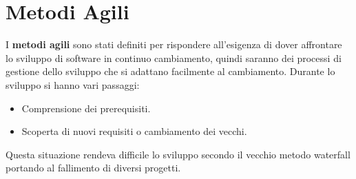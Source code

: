 \chapter{Metodi Agili}
I \textbf{metodi agili} sono stati definiti per rispondere all'esigenza di dover
affrontare lo sviluppo di software in continuo cambiamento, quindi saranno dei
processi di gestione dello sviluppo che si adattano facilmente al cambiamento.
Durante lo sviluppo si hanno vari passaggi:
\begin{itemize}
      \item Comprensione dei prerequisiti.
      \item Scoperta di nuovi requisiti o cambiamento dei vecchi.
\end{itemize}
Questa situazione rendeva difficile lo sviluppo secondo il vecchio metodo
waterfall portando al fallimento di diversi progetti.


